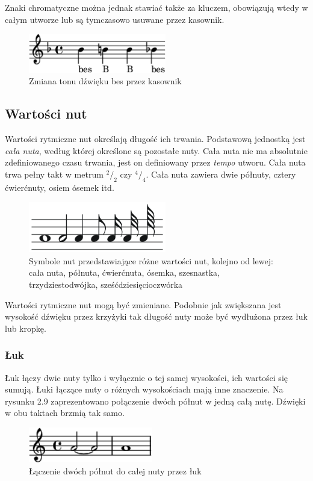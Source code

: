 \documentclass[printmode, eng, openany]{mgr}
\newcommand\tab[1][1cm]{\hspace*{#1}}
\newcommand*\rfrac[2]{{}^{#1}\!/_{#2}}
\begin{document}
\tab Znaki chromatyczne można jednak stawiać także za kluczem, obowiązują wtedy w całym utworze lub są tymczasowo usuwane przez kasownik.

\begin{figure}[!htb]
\centering
\includegraphics[width=6cm]{kasownik_cal}
\caption{Zmiana tonu dźwięku bes przez kasownik}
\end{figure}

\subsection{Wartości nut}
\tab Wartości rytmiczne nut określają długość ich trwania. Podstawową jednostką jest \textit{cała nuta}, według której określone są pozostałe nuty. Cała nuta nie ma absolutnie zdefiniowanego czasu trwania, jest on definiowany przez \textit{tempo} utworu. Cała nuta trwa pełny takt w metrum $\rfrac{2}{2}$ czy $\rfrac{4}{4}$. Cała nuta zawiera dwie półnuty, cztery ćwierćnuty, osiem ósemek itd.

\begin{figure}[H]
\centering
\includegraphics[width=6cm]{wartosci_nut}
\caption{Symbole nut przedstawiające różne wartości nut, kolejno od lewej: cała nuta, półnuta, ćwierćnuta, ósemka, szesnastka, trzydziestodwójka, sześćdziesięcioczwórka}
\end{figure}
\tab Wartości rytmiczne nut mogą być zmieniane. Podobnie jak zwiększana jest wysokość dźwięku przez krzyżyki tak długość nuty może być wydłużona przez łuk lub kropkę. 
\subsubsection{Łuk}
\tab Łuk łączy dwie nuty tylko i wyłącznie o tej samej wysokości, ich wartości się sumują. Łuki łączące nuty o różnych wysokościach mają inne znaczenie. Na rysunku 2.9 zaprezentowano połączenie dwóch półnut w jedną całą nutę. Dźwięki w obu taktach brzmią tak samo.

\begin{figure}[!htb]
\centering
\includegraphics[width=5.4cm]{luk}
\caption{Łączenie dwóch półnut do całej nuty przez łuk}
\end{figure}
\end{document}
